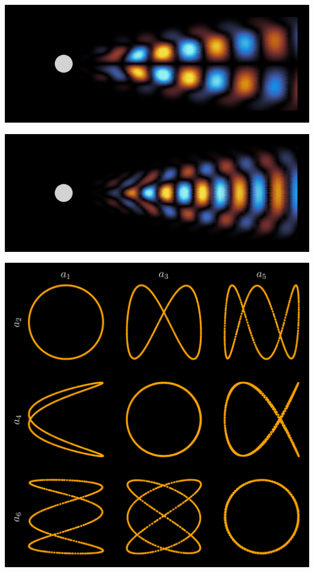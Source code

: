 \documentclass[aspectratio=169, usenames, dvipsnames]{beamer}
\begin{document}
\begin{frame}
\begin{minipage}{.48\textwidth}
    \vfill
    
    \includegraphics[width=\textwidth]{POD_modes_4}

    \vfill
    
    \includegraphics[width=\textwidth]{POD_modes_6}   
  \end{minipage}
  
  \vfill
\end{frame}

\begin{frame}%
  \vfill
  \centering

  \includegraphics[height=.95\textheight]{cylinder_phase_portraits}
  
  \vfill
\end{frame}
\end{document}
